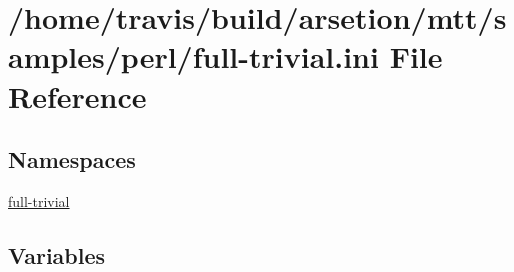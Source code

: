 \hypertarget{full-trivial_8ini}{\section{/home/travis/build/arsetion/mtt/samples/perl/full-\/trivial.ini File Reference}
\label{full-trivial_8ini}
}
\subsection*{Namespaces}
\begin{DoxyCompactItemize}
\item 
\hyperlink{namespacefull-trivial}{full-\/trivial}
\end{DoxyCompactItemize}
\subsection*{Variables}

